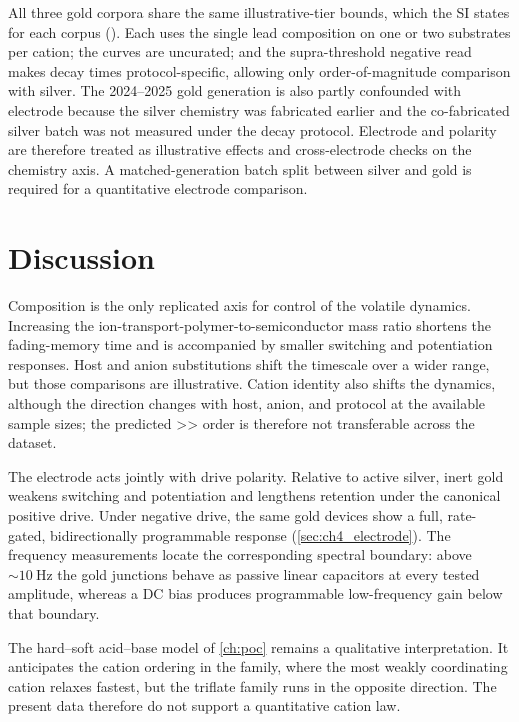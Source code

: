 \documentclass[12pt, twoside]{report}
\begin{document}
All three gold corpora share the same illustrative-tier bounds, which the SI states for each corpus (). Each uses the single lead composition on one or two substrates per cation; the curves are uncurated; and the supra-threshold negative read makes decay times protocol-specific, allowing only order-of-magnitude comparison with silver. The 2024--2025 gold generation is also partly confounded with electrode because the silver chemistry was fabricated earlier and the co-fabricated silver batch was not measured under the decay protocol. Electrode and polarity are therefore treated as illustrative effects and cross-electrode checks on the chemistry axis. A matched-generation batch split between silver and gold is required for a quantitative electrode comparison.

\section{Discussion}\label{sec:ch4_discussion}

Composition is the only replicated axis for control of the volatile dynamics. Increasing the ion-transport-polymer-to-semiconductor mass ratio shortens the fading-memory time and is accompanied by smaller switching and potentiation responses. Host and anion substitutions shift the timescale over a wider range, but those comparisons are illustrative. Cation identity also shifts the dynamics, although the direction changes with host, anion, and protocol at the available sample sizes; the predicted >> order is therefore not transferable across the dataset.

The electrode acts jointly with drive polarity. Relative to active silver, inert gold weakens switching and potentiation and lengthens retention under the canonical positive drive. Under negative drive, the same gold devices show a full, rate-gated, bidirectionally programmable response (\cref{sec:ch4_electrode}). The frequency measurements locate the corresponding spectral boundary: above \(\sim\!\SI{10}{\hertz}\) the gold junctions behave as passive linear capacitors at every tested amplitude, whereas a DC bias produces programmable low-frequency gain below that boundary.

The hard--soft acid--base model of \cref{ch:poc} remains a qualitative interpretation. It anticipates the cation ordering in the \TFSI{} family, where the most weakly coordinating cation relaxes fastest, but the triflate family runs in the opposite direction. The present data therefore do not support a quantitative cation law.
\end{document}
